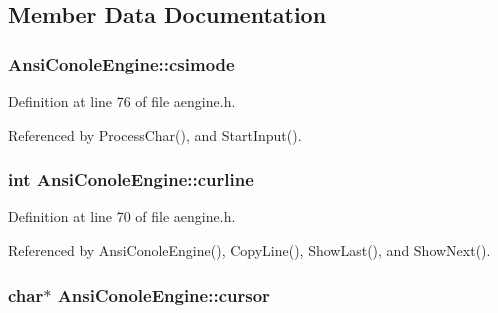 \subsection{Member Data Documentation}
\subsubsection[{\texorpdfstring{csimode}{csimode}}]{ Ansi\+Conole\+Engine\+::csimode\hspace{0.3cm}{\ttfamily [private]}}\hypertarget{classAnsiConoleEngine_adf2036857a6c6de85836ee2e7b3e5d6d}{}\label{classAnsiConoleEngine_adf2036857a6c6de85836ee2e7b3e5d6d}


Definition at line 76 of file aengine.\+h.



Referenced by Process\+Char(), and Start\+Input().

\subsubsection[{\texorpdfstring{curline}{curline}}]{\setlength{\rightskip}{0pt plus 5cm}int Ansi\+Conole\+Engine\+::curline\hspace{0.3cm}{\ttfamily [private]}}\hypertarget{classAnsiConoleEngine_ab029fc4a19c5fbd6f6b23c390af618b8}{}\label{classAnsiConoleEngine_ab029fc4a19c5fbd6f6b23c390af618b8}


Definition at line 70 of file aengine.\+h.



Referenced by Ansi\+Conole\+Engine(), Copy\+Line(), Show\+Last(), and Show\+Next().

\subsubsection[{\texorpdfstring{cursor}{cursor}}]{\setlength{\rightskip}{0pt plus 5cm}char$\ast$ Ansi\+Conole\+Engine\+::cursor\hspace{0.3cm}{\ttfamily [private]}}\hypertarget{classAnsiConoleEngine_aea3df1b13bc8ecf2eb68ec693249800f}{}\label{classAnsiConoleEngine_aea3df1b13bc8ecf2eb68ec693249800f}


